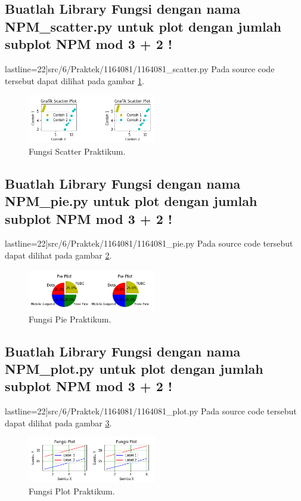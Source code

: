 \subsection{ Buatlah Library Fungsi dengan nama NPM\_scatter.py untuk plot dengan jumlah subplot NPM mod 3 + 2 !}
 lastline=22]{src/6/Praktek/1164081/1164081_scatter.py}
Pada source code tersebut dapat dilihat pada gambar \ref{1164081_2}.

	\begin{figure}[!htbp!]
		\centerline{\includegraphics[width=0.5\textwidth]{figures/6/Praktek/1164081/1164081_2.png}}
		\caption{Fungsi Scatter Praktikum.}
		\label{1164081_2}
	\end{figure}
\subsection{ Buatlah Library Fungsi dengan nama NPM\_pie.py untuk plot dengan jumlah subplot NPM mod 3 + 2 !}
 lastline=22]{src/6/Praktek/1164081/1164081_pie.py}
Pada source code tersebut dapat dilihat pada gambar \ref{1164081_3}.

	\begin{figure}[!htbp!]
		\centerline{\includegraphics[width=0.5\textwidth]{figures/6/Praktek/1164081/1164081_3.png}}
		\caption{Fungsi Pie Praktikum.}
		\label{1164081_3}
	\end{figure}
\subsection{ Buatlah Library Fungsi dengan nama NPM\_plot.py untuk plot dengan jumlah subplot NPM mod 3 + 2 !}
 lastline=22]{src/6/Praktek/1164081/1164081_plot.py}
Pada source code tersebut dapat dilihat pada gambar \ref{1164081_4}.

	\begin{figure}[!htbp!]
		\centerline{\includegraphics[width=0.5\textwidth]{figures/6/Praktek/1164081/1164081_4.png}}
		\caption{Fungsi Plot Praktikum.}
		\label{1164081_4}
	\end{figure}



